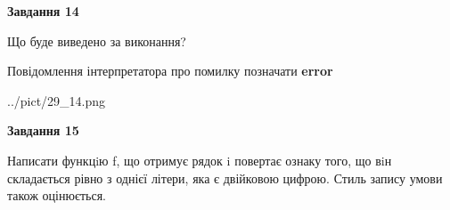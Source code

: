 \documentclass[11pt, ukrainian]{article}
\begin{document}
{\begin {large}
{\begin {center}\textbf{Завдання 14}\end {center}}\par
Що буде виведено за виконання? \par
Повідомлення інтерпретатора про помилку позначати \textbf{error}

\begin{center}
	{../pict/29_14.png}
\end{center}
\newpage

{\begin {center}\textbf{Завдання 15}\end {center}}\par

Написати функцiю f, що отримує рядок i повертає ознаку того, що вiн складається рівно з однієї літери, яка є двійковою цифрою. Стиль запису умови також оцінюється.\par
\newpage

\end {large}}
\end{document}
